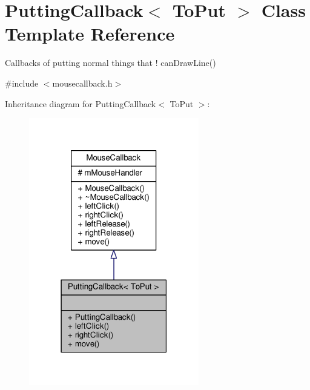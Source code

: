 \hypertarget{classPuttingCallback}{}\section{Putting\+Callback$<$ To\+Put $>$ Class Template Reference}
\label{classPuttingCallback}


Callbacks of putting normal things that ! can\+Draw\+Line()  




{\ttfamily \#include $<$mousecallback.\+h$>$}



Inheritance diagram for Putting\+Callback$<$ To\+Put $>$\+:\nopagebreak
\begin{figure}[H]
\begin{center}
\leavevmode
\includegraphics[width=210pt]{classPuttingCallback__inherit__graph}
\end{center}
\end{figure}


